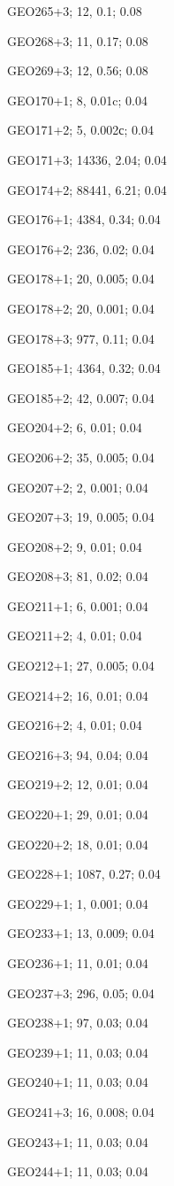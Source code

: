 GEO265+3; 12, 0.1; 0.08

GEO268+3; 11, 0.17; 0.08

GEO269+3; 12, 0.56; 0.08

GEO170+1; 8, 0.01c; 0.04

GEO171+2; 5, 0.002с; 0.04

GEO171+3; 14336, 2.04; 0.04

GEO174+2; 88441, 6.21; 0.04

GEO176+1; 4384, 0.34; 0.04

GEO176+2; 236, 0.02; 0.04

GEO178+1; 20, 0.005; 0.04

GEO178+2; 20, 0.001; 0.04

GEO178+3; 977, 0.11; 0.04

GEO185+1; 4364, 0.32; 0.04

GEO185+2; 42, 0.007; 0.04

GEO204+2; 6, 0.01; 0.04

GEO206+2; 35, 0.005; 0.04

GEO207+2; 2, 0.001; 0.04

GEO207+3; 19, 0.005; 0.04

GEO208+2; 9, 0.01; 0.04

GEO208+3; 81, 0.02; 0.04

GEO211+1; 6, 0.001; 0.04

GEO211+2; 4, 0.01; 0.04

GEO212+1; 27, 0.005; 0.04

GEO214+2; 16, 0.01; 0.04

GEO216+2; 4, 0.01; 0.04

GEO216+3; 94, 0.04; 0.04

GEO219+2; 12, 0.01; 0.04

GEO220+1; 29, 0.01; 0.04

GEO220+2; 18, 0.01; 0.04

GEO228+1; 1087, 0.27; 0.04

GEO229+1; 1, 0.001; 0.04

GEO233+1; 13, 0.009; 0.04

GEO236+1; 11, 0.01; 0.04

GEO237+3; 296, 0.05; 0.04

GEO238+1; 97, 0.03; 0.04

GEO239+1; 11, 0.03; 0.04

GEO240+1; 11, 0.03; 0.04

GEO241+3; 16, 0.008; 0.04

GEO243+1; 11, 0.03; 0.04

GEO244+1; 11, 0.03; 0.04

